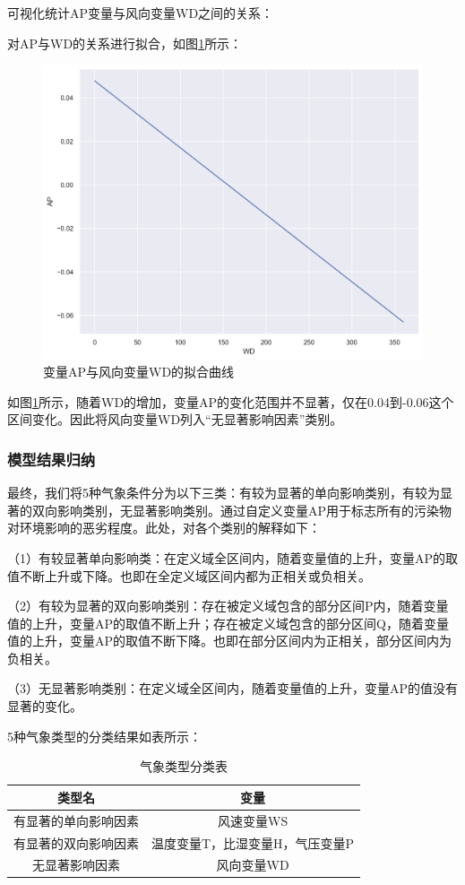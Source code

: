 \documentclass[bwprint]{gmcmthesis}
\numberwithin{figure}{section}
\begin{document}
 可视化统计AP变量与风向变量WD之间的关系：

对AP与WD的关系进行拟合，如图\ref{fig3-10}所示：
\begin{figure}[!h]
	\centering
	\includegraphics[width=.7\textwidth]{figures//fig_WD_fit.png}
	\caption{变量AP与风向变量WD的拟合曲线}
	\label{fig3-10}
\end{figure}

如图\ref{fig3-10}所示，随着WD的增加，变量AP的变化范围并不显著，仅在0.04到-0.06这个区间变化。因此将风向变量WD列入“无显著影响因素”类别。

\subsubsection{模型结果归纳}
最终，我们将5种气象条件分为以下三类：有较为显著的单向影响类别，有较为显著的双向影响类别，无显著影响类别。通过自定义变量AP用于标志所有的污染物对环境影响的恶劣程度。此处，对各个类别的解释如下：

（1）有较显著单向影响类：在定义域全区间内，随着变量值的上升，变量AP的取值不断上升或下降。也即在全定义域区间内都为正相关或负相关。

（2）有较为显著的双向影响类别：存在被定义域包含的部分区间P内，随着变量值的上升，变量AP的取值不断上升；存在被定义域包含的部分区间Q，随着变量值的上升，变量AP的取值不断下降。也即在部分区间内为正相关，部分区间内为负相关。

（3）无显著影响类别：在定义域全区间内，随着变量值的上升，变量AP的值没有显著的变化。

5种气象类型的分类结果如表所示：
\begin{table}[h!]
	\caption{气象类型分类表}\label{tab:table4-6}
	\begin{center}
		\begin{tabular}{|c|c|}
			\hline
			类型名&变量\\
			\hline
			有显著的单向影响因素&风速变量WS\\
			\hline
			有显著的双向影响因素&温度变量T，比湿变量H，气压变量P\\
			\hline
			无显著影响因素&风向变量WD\\
			\hline
		\end{tabular}
	\end{center}
\end{table}
\end{document}
